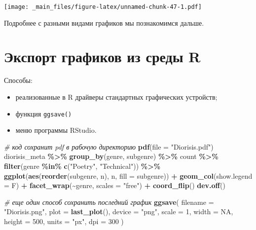 \documentclass[
]{book}
\newenvironment{Shaded}{\begin{snugshade}}{\end{snugshade}}
\newcommand{\AttributeTok}[1]{\textcolor[rgb]{0.13,0.29,0.53}{#1}}
\newcommand{\CommentTok}[1]{\textcolor[rgb]{0.56,0.35,0.01}{\textit{#1}}}
\newcommand{\ConstantTok}[1]{\textcolor[rgb]{0.56,0.35,0.01}{#1}}
\newcommand{\DecValTok}[1]{\textcolor[rgb]{0.00,0.00,0.81}{#1}}
\newcommand{\FunctionTok}[1]{\textcolor[rgb]{0.13,0.29,0.53}{\textbf{#1}}}
\newcommand{\NormalTok}[1]{#1}
\newcommand{\SpecialCharTok}[1]{\textcolor[rgb]{0.81,0.36,0.00}{\textbf{#1}}}
\newcommand{\StringTok}[1]{\textcolor[rgb]{0.31,0.60,0.02}{#1}}
\providecommand{\tightlist}{%
  \setlength{\itemsep}{0pt}\setlength{\parskip}{0pt}}
\theoremstyle{definition}
\theoremstyle{definition}
\theoremstyle{definition}
\theoremstyle{definition}
\theoremstyle{remark}
\begin{document}
\texttt{[image: \_main\_files/figure-latex/unnamed-chunk-47-1.pdf]}

Подробнее с разными видами графиков мы познакомимся дальше.

\hypertarget{ux44dux43aux441ux43fux43eux440ux442-ux433ux440ux430ux444ux438ux43aux43eux432-ux438ux437-ux441ux440ux435ux434ux44b-r}{%
\section{Экспорт графиков из среды R}\label{ux44dux43aux441ux43fux43eux440ux442-ux433ux440ux430ux444ux438ux43aux43eux432-ux438ux437-ux441ux440ux435ux434ux44b-r}}

Способы:

\begin{itemize}
\tightlist
\item
  реализованные в R драйверы стандартных графических устройств;
\item
  функция \texttt{ggsave()}
\item
  меню программы RStudio.
\end{itemize}

\begin{Shaded}
\begin{Highlighting}[]
\CommentTok{\# код сохранит pdf в рабочую директорию }
\FunctionTok{pdf}\NormalTok{(}\AttributeTok{file =} \StringTok{"Diorisis.pdf"}\NormalTok{)}
\NormalTok{diorisis\_meta }\SpecialCharTok{\%\textgreater{}\%} 
  \FunctionTok{group\_by}\NormalTok{(genre, subgenre) }\SpecialCharTok{\%\textgreater{}\%} 
\NormalTok{  count }\SpecialCharTok{\%\textgreater{}\%}
  \FunctionTok{filter}\NormalTok{(genre }\SpecialCharTok{\%in\%} \FunctionTok{c}\NormalTok{(}\StringTok{"Poetry"}\NormalTok{, }\StringTok{"Technical"}\NormalTok{)) }\SpecialCharTok{\%\textgreater{}\%} 
  \FunctionTok{ggplot}\NormalTok{(}\FunctionTok{aes}\NormalTok{(}\FunctionTok{reorder}\NormalTok{(subgenre, n), n, }\AttributeTok{fill =}\NormalTok{ subgenre)) }\SpecialCharTok{+} 
  \FunctionTok{geom\_col}\NormalTok{(}\AttributeTok{show.legend =}\NormalTok{ F) }\SpecialCharTok{+}
  \FunctionTok{facet\_wrap}\NormalTok{(}\SpecialCharTok{\textasciitilde{}}\NormalTok{genre, }\AttributeTok{scales =} \StringTok{"free"}\NormalTok{) }\SpecialCharTok{+}
  \FunctionTok{coord\_flip}\NormalTok{()}
\FunctionTok{dev.off}\NormalTok{()}

\CommentTok{\# еще один способ сохранить последний график}
\FunctionTok{ggsave}\NormalTok{(}
  \AttributeTok{filename =} \StringTok{"Diorisis.png"}\NormalTok{,}
  \AttributeTok{plot =} \FunctionTok{last\_plot}\NormalTok{(),}
  \AttributeTok{device =} \StringTok{"png"}\NormalTok{,}
  \AttributeTok{scale =} \DecValTok{1}\NormalTok{,}
  \AttributeTok{width =} \ConstantTok{NA}\NormalTok{,}
  \AttributeTok{height =} \DecValTok{500}\NormalTok{,}
  \AttributeTok{units =} \StringTok{"px"}\NormalTok{,}
  \AttributeTok{dpi =} \DecValTok{300}
\NormalTok{)}
\end{Highlighting}
\end{Shaded}
\end{document}
